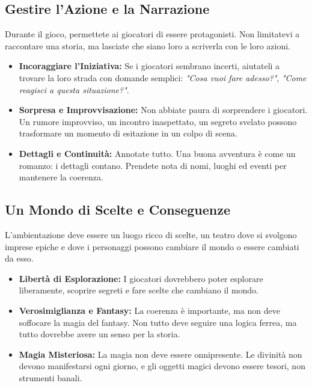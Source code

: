 \documentclass[../manuale_main.tex]{subfiles}
\begin{document}
\subsection{Gestire l'Azione e la Narrazione}
Durante il gioco, permettete ai giocatori di essere protagonisti. Non limitatevi a raccontare una storia, ma lasciate che siano loro a scriverla con le loro azioni.

\begin{itemize}
    \item \textbf{Incoraggiare l'Iniziativa:} Se i giocatori sembrano incerti, aiutateli a trovare la loro strada con domande semplici: \textit{"Cosa vuoi fare adesso?"}, \textit{"Come reagisci a questa situazione?"}.
    
    \item \textbf{Sorpresa e Improvvisazione:} Non abbiate paura di sorprendere i giocatori. Un rumore improvviso, un incontro inaspettato, un segreto svelato possono trasformare un momento di esitazione in un colpo di scena.
    
    \item \textbf{Dettagli e Continuità:} Annotate tutto. Una buona avventura è come un romanzo: i dettagli contano. Prendete nota di nomi, luoghi ed eventi per mantenere la coerenza.
\end{itemize}

\vspace{0.3cm}

\subsection{Un Mondo di Scelte e Conseguenze}
L'ambientazione deve essere un luogo ricco di scelte, un teatro dove si svolgono imprese epiche e dove i personaggi possono cambiare il mondo o essere cambiati da esso.

\begin{itemize}
    \item \textbf{Libertà di Esplorazione:} I giocatori dovrebbero poter esplorare liberamente, scoprire segreti e fare scelte che cambiano il mondo.
    
    \item \textbf{Verosimiglianza e Fantasy:} La coerenza è importante, ma non deve soffocare la magia del fantasy. Non tutto deve seguire una logica ferrea, ma tutto dovrebbe avere un senso per la storia.
    
    \item \textbf{Magia Misteriosa:} La magia non deve essere onnipresente. Le divinità non devono manifestarsi ogni giorno, e gli oggetti magici devono essere tesori, non strumenti banali.
\end{itemize}
\end{document}

